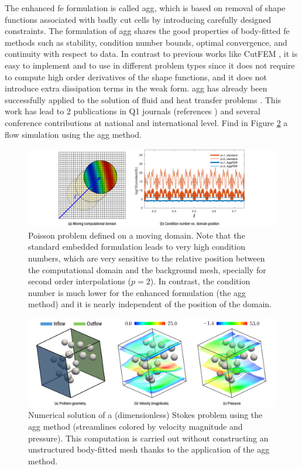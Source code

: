 \documentclass{article}
\begin{document}
The enhanced \ac{fe} formulation is called \ac{agg}, which is based on removal of shape functions associated with badly cut cells by introducing carefully designed constraints.  The formulation of \ac{agg} shares the good properties of body-fitted \ac{fe} methods such as stability, condition number bounds, optimal convergence, and continuity with respect to data.  In contrast to previous works like CutFEM \cite{burman_cutfem:_2015}, it is easy to implement and to use in different problem types since it does not require to compute high order derivatives of the shape functions, and it does not introduce extra dissipation terms in the weak form.  \ac{agg} has already been successfully applied to the solution of fluid \cite{Badia2018a} and heat transfer problems \cite{Badia2018}. This work has lead to {{2 publications in Q1 journals}} (references \cite{Badia2018,Badia2018a} ) and several conference contributions at national and international level. Find in Figure \ref{fig:complex-case1-sol} a flow simulation using the \ac{agg} method.

\begin{figure}[ht!]
\includegraphics[width=\textwidth]{../_assets/fig3.png}
\caption{Poisson problem defined on a moving domain. Note that the standard embedded formulation leads to very high condition numbers, which are very sensitive to the relative position between the computational domain and the background mesh, specially for second order interpolations ($p=2$). In contrast, the condition number is much lower for the enhanced formulation (the \ac{agg} method) and it is nearly independent of the position of the domain.}
\label{fig:aggfem}
\end{figure}


\begin{figure}[ht!]
\includegraphics[width=\textwidth]{../_assets/fig4.png}
  \caption{Numerical solution of a (dimensionless) Stokes problem using the \ac{agg} method (streamlines colored by velocity magnitude and pressure). This computation is carried out without constructing an unstructured body-fitted mesh thanks to the application of the \ac{agg} method.}
  \label{fig:complex-case1-sol}
\end{figure}
\end{document}
